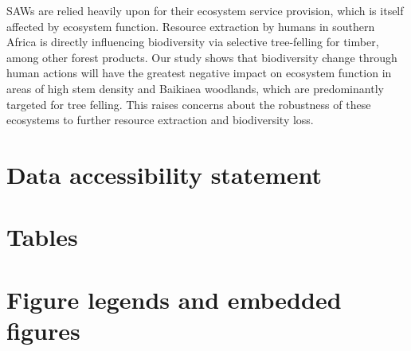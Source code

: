 \documentclass[11pt,a4paper]{article}
\begin{document}
SAWs are relied heavily upon for their ecosystem service provision, which is itself affected by ecosystem function. Resource extraction by humans in southern Africa is directly influencing biodiversity via selective tree-felling for timber, among other forest products. Our study shows that biodiversity change through human actions will have the greatest negative impact on ecosystem function in areas of high stem density and Baikiaea woodlands, which are predominantly targeted for tree felling. This raises concerns about the robustness of these ecosystems to further resource extraction and biodiversity loss.




\newpage{}
\appendix{}

\section{Data accessibility statement}

\section{Tables}

\section{Figure legends and embedded figures}
\end{document}
